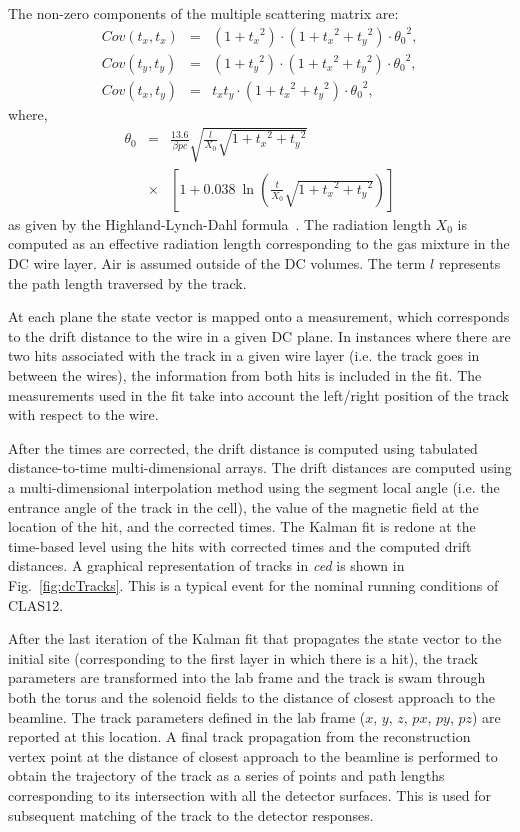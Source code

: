 The non-zero components of the multiple scattering matrix are:
\begin{eqnarray}
Cov (t_x , t_x) &=& (1+{t_x}^2 )\cdot (1+{t_x}^2 + {t_y}^2 )\cdot {\theta_0}^2 , \nonumber \\
Cov (t_y , t_y) &=& (1+{t_y}^2 )\cdot (1+{t_x}^2 + {t_y}^2 )\cdot {\theta_0}^2 , \nonumber \\
Cov (t_x , t_y) &=&  t_x t_y\cdot (1+{t_x}^2 + {t_y}^2 )\cdot {\theta_0}^2 ,
\end{eqnarray}
\noindent
where,
\begin{eqnarray}
  {\theta_0} &=& \frac{13.6}{\beta pc}\sqrt{\frac{l}{X_0}\sqrt{1+{t_x}^2+{t_y}^2}}\\
  &\times&\left[ {1+0.038~\ln \left({\frac{t}{X_0}\sqrt{1+{t_x}^2+{t_y}^2}}\right) }\right] \nonumber
\end{eqnarray}
\noindent
as given by the Highland-Lynch-Dahl formula~\cite{Highland-Lynch-Dahl}. The radiation length $X_0$ is computed
as an effective radiation length corresponding to the gas mixture in the DC wire layer. Air is assumed outside of
the DC volumes. The term $l$ represents the path length traversed by the track.

At each plane the state vector is mapped onto a measurement, which corresponds to the drift distance to the
wire in a given DC plane.  In instances where there are two hits associated with the track in a given wire layer
(i.e. the track goes in between the wires), the information from both hits is included in the fit. The measurements
used in the fit take into account the left/right position of the track with respect to the wire.

After the times are corrected, the drift distance is computed using tabulated distance-to-time multi-dimensional
arrays. The drift distances are computed using a multi-dimensional interpolation method using the segment local
angle (i.e. the entrance angle of the track in the cell), the value of the magnetic field at the location of the hit, and
the corrected times. The Kalman fit is redone at the time-based level using the hits with corrected times and the
computed drift distances. A graphical representation of tracks in {\it ced} is shown in Fig.~\ref{fig:dcTracks}. This
is a typical event for the nominal running conditions of CLAS12. 

After the last iteration of the Kalman fit that propagates the state vector to the initial site (corresponding to the first
layer in which there is a hit), the track parameters are transformed into the lab frame and the track is swam through
both the torus and the solenoid fields to the distance of closest approach to the beamline. The track parameters
defined in the lab frame ($x$, $y$, $z$, $px$, $py$, $pz$) are reported at this location.  A final track propagation
from the reconstruction vertex point at the distance of closest approach to the beamline is performed to obtain the
trajectory of the track as a series of points and path lengths corresponding to its intersection with all the detector
surfaces. This is used for subsequent matching of the track to the detector responses.


